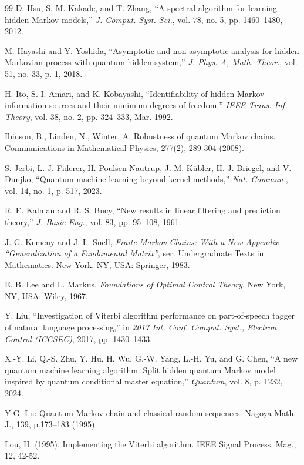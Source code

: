 \documentclass[12pt, reco]{article}
\begin{document}
\begin{thebibliography}{99}
D. Hsu, S. M. Kakade, and T. Zhang, ``A spectral algorithm for learning hidden Markov models,'' \emph{J. Comput. Syst. Sci.}, vol. 78, no. 5, pp. 1460--1480, 2012.

M. Hayashi and Y. Yoshida, ``Asymptotic and non-asymptotic analysis for hidden Markovian process with quantum hidden system,'' \emph{J. Phys. A, Math. Theor.}, vol. 51, no. 33, p. 1, 2018.

H. Ito, S.-I. Amari, and K. Kobayashi, ``Identifiability of hidden Markov information sources and their minimum degrees of freedom,'' \emph{IEEE Trans. Inf. Theory}, vol. 38, no. 2, pp. 324--333, Mar. 1992.

 Ibinson, B., Linden, N.,  Winter, A.  Robustness of quantum Markov chains. Communications in Mathematical Physics, 277(2), 289-304 (2008).

S. Jerbi, L. J. Fiderer, H. Poulsen Nautrup, J. M. Kübler, H. J. Briegel, and V. Dunjko, ``Quantum machine learning beyond kernel methods,'' \emph{Nat. Commun.}, vol. 14, no. 1, p. 517, 2023.

R. E. Kalman and R. S. Bucy, ``New results in linear filtering and prediction theory,'' \emph{J. Basic Eng.}, vol. 83, pp. 95--108, 1961.

J. G. Kemeny and J. L. Snell, \emph{Finite Markov Chains: With a New Appendix ``Generalization of a Fundamental Matrix''}, ser. Undergraduate Texts in Mathematics. New York, NY, USA: Springer, 1983.

E. B. Lee and L. Markus, \emph{Foundations of Optimal Control Theory}. New York, NY, USA: Wiley, 1967.

Y. Liu, ``Investigation of Viterbi algorithm performance on part-of-speech tagger of natural language processing,'' in \emph{2017 Int. Conf. Comput. Syst., Electron. Control (ICCSEC)}, 2017, pp. 1430--1433.

X.-Y. Li, Q.-S. Zhu, Y. Hu, H. Wu, G.-W. Yang, L.-H. Yu, and G. Chen, ``A new quantum machine learning algorithm: Split hidden quantum Markov model inspired by quantum conditional master equation,'' \emph{Quantum}, vol. 8, p. 1232, 2024.

  Y.G. Lu: Quantum Markov chain and classical random sequences. Nagoya Math. J., 139, p.173–183 (1995)
    
  Lou, H. (1995). Implementing the Viterbi algorithm. IEEE Signal Process. Mag., 12, 42-52.
 

\end{thebibliography}
\end{document}
